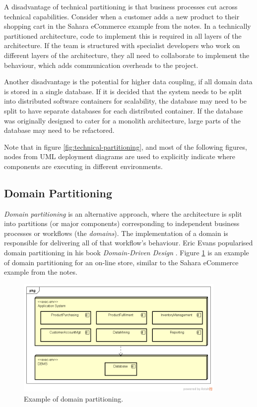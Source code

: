 \clearpage
A disadvantage of technical partitioning is that business processes cut across technical capabilities.
Consider when a customer adds a new product to their shopping cart in the Sahara eCommerce example
from the  notes.
In a technically partitioned architecture, code to implement this is required in all layers of the architecture.
If the team is structured with specialist developers who work on different layers of the architecture,
they all need to collaborate to implement the behaviour, which adds communication overheads to the project.

Another disadvantage is the potential for higher data coupling, if all domain data is stored in a single database.
If it is decided that the system needs to be split into distributed software containers for scalability,
the database may need to be split to have separate databases for each distributed container.
If the database was originally designed to cater for a monolith architecture, large parts of the database may need to be refactored.

Note that in figure \ref{fig:technical-partitioning}, and most of the following figures,
nodes from UML deployment diagrams are used to explicitly indicate where components are executing in different environments.

\subsection{Domain Partitioning}
\emph{Domain partitioning} is an alternative approach, where the architecture is split into partitions (or major components)
corresponding to independent business processes or workflows (the \emph{domains}).
The implementation of a domain is responsible for delivering all of that workflow's behaviour.
Eric Evans popularised domain partitioning in his book \textit{Domain-Driven Design} \cite{ddd-evans}.
Figure \ref{fig:domain-partitioning} is an example of domain partitioning for an on-line store, similar to the
Sahara eCommerce example from the  notes.

\begin{figure}[h!]
    \centering
    \includegraphics[trim=38 42 19 44,clip,width=0.9\textwidth]{diagrams/domain-partitioning.png}
    \caption{Example of domain partitioning.}
    \label{fig:domain-partitioning}
\end{figure}

